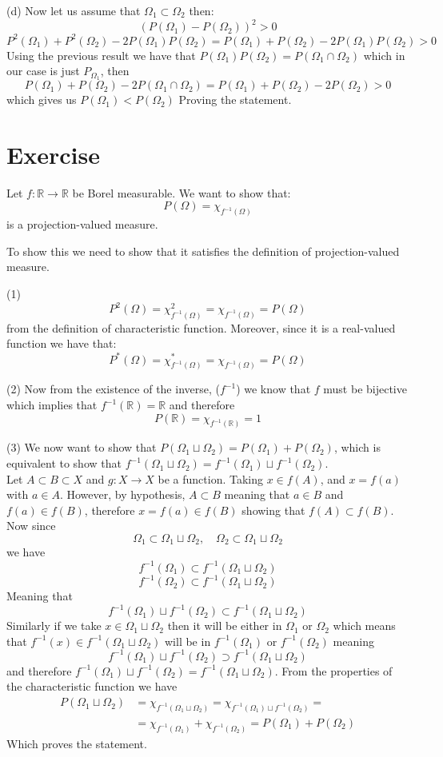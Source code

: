 \documentclass{article}
\newcommand{\R}{\mathbb{R}}
\begin{document}
(d) Now let us assume that $\Omega_1 \subset \Omega_2$ then:
\[
    {(P(\Omega_1) - P(\Omega_2))}^2 > 0
\]
\[
    P^2(\Omega_1) + P^2(\Omega_2) - 2P(\Omega_1)P(\Omega_2) = P(\Omega_1) + P(\Omega_2) - 2P(\Omega_1)P(\Omega_2) > 0
\]
Using the previous result we have that $P(\Omega_1)P(\Omega_2) = P(\Omega_1 \cap \Omega_2)$ which in our case is just $P_{\Omega_1}$, then
\[
    P(\Omega_1) + P(\Omega_2) - 2P(\Omega_1 \cap \Omega_2) = P(\Omega_1) + P(\Omega_2) - 2P(\Omega_2) > 0
\]
which gives us $P(\Omega_1) < P(\Omega_2)$ Proving the statement.
\section{Exercise}
Let $f : \R \to \R$ be Borel measurable. We want to show that:
\[
    P(\Omega) = \chi_{f^{-1}(\Omega)}
\]
is a projection-valued measure.

To show this we need to show that it satisfies the definition of projection-valued measure.

(1)
\[
    P^2(\Omega) = \chi_{f^{-1}(\Omega)}^2 = \chi_{f^{-1}(\Omega)} = P(\Omega)
\]
from the definition of characteristic function. Moreover, since it is a real-valued function we have that:
\[
    P^*(\Omega) = \chi_{f^{-1}(\Omega)}^* = \chi_{f^{-1}(\Omega)} = P(\Omega)
\]

(2) Now from the existence of the inverse, ($f^{-1}$) we know that $f$ must be bijective which implies that $f^{-1}(\R) = \R$ and therefore
\[
    P(\R) = \chi_{f^{-1}(\R)} = 1
\]

(3) We now want to show that $P(\Omega_1 \sqcup \Omega_2) = P(\Omega_1) + P(\Omega_2)$, which is equivalent to show that $f^{-1}(\Omega_1 \sqcup \Omega_2) = f^{-1}(\Omega_1) \sqcup f^{-1}(\Omega_2)$. 
\\ Let $A \subset B \subset X$ and $g:X \to X$ be a function. Taking $ x \in f(A)$, and $x = f(a)$ with $a \in A$. However, by hypothesis, $A \subset B$ meaning that $a \in B$ and $f(a) \in f(B)$, therefore $x=f(a) \in f(B)$ showing that $f(A)\subset f(B)$. Now since
\[
    \Omega_1 \subset \Omega_1 \sqcup \Omega_2, \quad \Omega_2 \subset \Omega_1 \sqcup \Omega_2
\]
we have
\[
    f^{-1}(\Omega_1) \subset f^{-1}(\Omega_1 \sqcup \Omega_2)
\]
\[
    f^{-1}(\Omega_2) \subset f^{-1}(\Omega_1 \sqcup \Omega_2)
\]
Meaning that 
\[
    f^{-1}(\Omega_1) \sqcup f^{-1}(\Omega_2) \subset f^{-1}(\Omega_1 \sqcup \Omega_2)
\]
Similarly if we take $x \in \Omega_1 \sqcup \Omega_2$ then it will be either in $\Omega_1$ or $\Omega_2$ which means that $f^{-1}(x) \in f^{-1}(\Omega_1 \sqcup \Omega_2)$ will be in $f^{-1}(\Omega_1)$ or $f^{-1}(\Omega_2)$ meaning
\[
    f^{-1}(\Omega_1) \sqcup f^{-1}(\Omega_2) \supset f^{-1}(\Omega_1 \sqcup \Omega_2)
\]
and therefore $f^{-1}(\Omega_1) \sqcup f^{-1}(\Omega_2) = f^{-1}(\Omega_1 \sqcup \Omega_2)$. From the properties of the characteristic function we have 
\[
    \begin{split}
        P(\Omega_1 \sqcup \Omega_2) &= \chi_{f^{-1}(\Omega_1 \sqcup \Omega_2)} = \chi_{f^{-1}(\Omega_1) \sqcup f^{-1} (\Omega_2)} =\\
        &= \chi_{f^{-1}(\Omega_1)} + \chi_{f^{-1}(\Omega_2)} = P(\Omega_1) + P(\Omega_2)
    \end{split}
\]
Which proves the statement.
\end{document}
